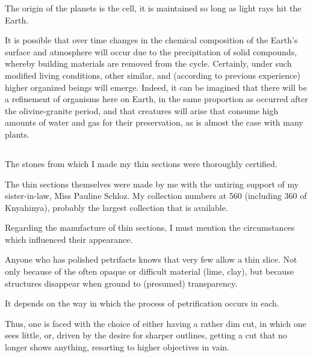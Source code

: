\documentclass[a4paper, 12pt, oneside]{article}
\begin{document}
The origin of the planets is the cell, it is maintained so long as light rays hit the Earth.

It is possible that over time changes in the chemical composition of the Earth's surface and atmosphere will occur due to the precipitation of solid compounds, whereby building materials are removed from the cycle. Certainly, under such modified living conditions, other similar, and (according to previous experience) higher organized beings will emerge. Indeed, it can be imagined that there will be a refinement of organisms here on Earth, in the same proportion as occurred after the olivine-granite period, and that creatures will arise that consume high amounts of water and gas for their preservation, as is almost the case with many plants.
\clearpage
\subsection{}
\subsection{}
\paragraph*{}
The stones from which I made my thin sections were thoroughly certified.

The thin sections themselves were made by me with the untiring support of my sister-in-law, Miss Pauline Schloz. My collection numbers at 560 (including 360 of Knyahinya), probably the largest collection that is available.

Regarding the manufacture of thin sections, I must mention the circumstances which influenced their appearance.

Anyone who has polished petrifacts knows that very few allow a thin slice. Not only because of the often opaque or difficult material (lime, clay), but because structures disappear when ground to (presumed) transparency.

It depends on the way in which the process of petrification occurs in each.

Thus, one is faced with the choice of either having a rather dim cut, in which one sees little, or, driven by the desire for sharper outlines, getting a cut that no longer shows anything, resorting to higher objectives in vain.
\end{document}
